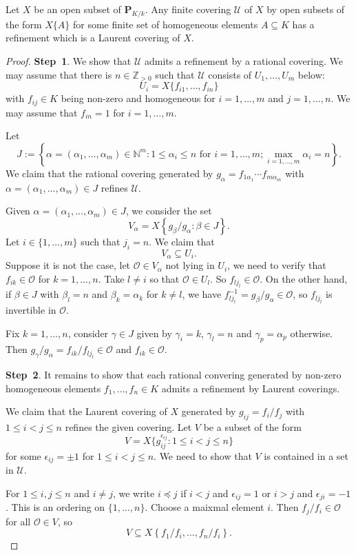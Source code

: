 \begin{lemma}\label{lma-opencovlaurentrefrz}
    Let $X$ be an open subset of $\mathbf{P}_{K/k}$.
    Any finite covering $\mathcal{U}$ of $X$ by open subsets of the form $X\{A\}$ for some finite set of homogeneous elements $A\subseteq K$ has a refinement which is a Laurent covering of $X$. 
\end{lemma}
\begin{proof}
    \textbf{Step~1}. We show that $\mathcal{U}$ admits a refinement by a rational covering. We may assume that there is $n\in \mathbb{Z}_{>0}$ such that $\mathcal{U}$ consists of $U_1,\ldots,U_m$ below:
    \[
        U_i=X\{f_{i1},\ldots,f_{in}\}
    \]
    with $f_{ij}\in K$ being non-zero and homogeneous for $i=1,\ldots,m$ and $j=1,\ldots,n$. We may assume that $f_{in}=1$ for $i=1,\ldots,m$.

    Let 
    \[
        J:=\left\{ \alpha=(\alpha_1,\ldots,\alpha_m)\in \mathbb{N}^m: 1\leq \alpha_i\leq n\text{ for }i=1,\ldots,m; \max_{i=1,\ldots,m}\alpha_i=n \right\}.  
    \] 
    We claim that the rational covering generated by $g_{\alpha}=f_{1\alpha_1}\cdots f_{m\alpha_m}$ with $\alpha=(\alpha_1,\ldots,\alpha_m)\in J$ refines $\mathcal{U}$.

    Given $\alpha=(\alpha_1,\ldots,\alpha_m)\in J$, we consider the set 
    \[
        V_{\alpha}=X\left\{g_{\beta}/g_{\alpha} :\beta\in J \right\}.  
    \]
    Let $i\in \{1,\ldots,m\}$ such that $j_i=n$. We claim that
    \[
        V_{\alpha}\subseteq U_i.
    \]
    Suppose it is not the case, let $\mathcal{O}\in V_{\alpha}$ not lying in $U_i$, we need to verify that $f_{ik}\in \mathcal{O}$ for $k=1,\ldots,n$. 
    Take $l\neq i$ so that $\mathcal{O}\in U_l$. So $f_{lj_l}\in \mathcal{O}$. On the other hand, if $\beta\in J$ with $\beta_l=n$ and $\beta_k=\alpha_k$ for $k\neq l$, we have $f_{lj_l}^{-1}=g_{\beta}/g_{\alpha}\in \mathcal{O}$, so $f_{lj_l}$ is invertible in $\mathcal{O}$. 
    
    Fix $k=1,\ldots,n$, consider $\gamma\in J$ given by $\gamma_i=k$, $\gamma_l=n$ and $\gamma_p=\alpha_p$ otherwise. Then $g_{\gamma}/g_{\alpha}=f_{ik}/f_{lj_l}\in \mathcal{O}$ and $f_{ik}\in \mathcal{O}$.

    \textbf{Step~2}. It remains to show that each rational convering generated by non-zero homogeneous elements $f_1,\ldots,f_n \in K$ admits a refinement by Laurent coverings. 

    We claim that the Laurent covering of $X$ generated by $g_{ij}=f_i/f_j$ with $1\leq i<j\leq n$ refines the given covering. Let $V$ be a subset of the form
    \[
        V=X\{g_{ij}^{\epsilon_{ij}}:1\leq i<j\leq n\}  
    \]
    for some $\epsilon_{ij}=\pm 1$ for $1\leq i<j\leq n$. We need to show that $V$ is contained in a set in $\mathcal{U}$.

    For $1\leq i,j\leq n$ and $i\neq j$, we write $i\preceq j$ if $i<j$ and $\epsilon_{ij}=1$ or $i>j$ and $\epsilon_{ji}=-1$. This is an ordering on $\{1,\ldots,n\}$. Choose a maixmal element $i$. Then $f_j/f_i\in \mathcal{O}$ for all $\mathcal{O}\in V$, so 
    \[
        V\subseteq X\left\{f_1/f_i,\ldots,f_n/f_i \right\}.  
    \]
\end{proof}



